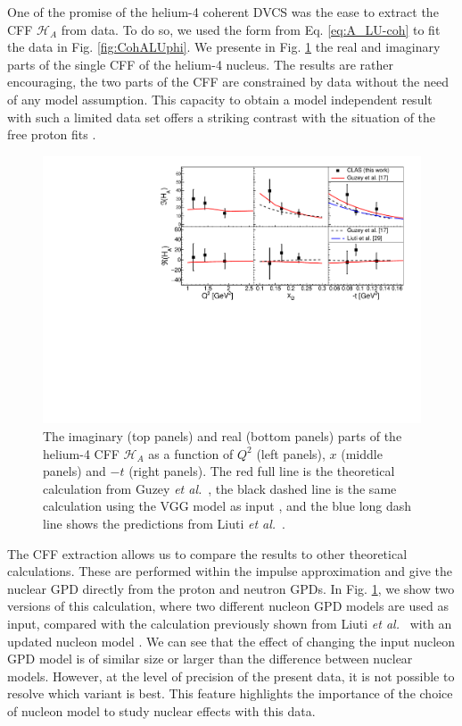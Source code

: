 \documentclass[aps,prc,preprint,superscriptaddress]{revtex4}
\begin{document}
One of the promise of the helium-4 coherent DVCS was the ease to extract the CFF $\mathcal{H}_A$ from
data. To do so, we used the form from Eq. \ref{eq:A_LU-coh} to fit the data in Fig. 
\ref{fig:CohALUphi}. We presente in Fig. \ref{fig:CohCFF} the real and imaginary parts 
of the single CFF of the helium-4 nucleus. The results are rather encouraging, the two parts
of the CFF are constrained by data without the need of any model assumption. This capacity to obtain a
model independent result with such a limited data set offers a striking contrast with the
situation of the free proton fits \cite{Dupre:2016mai,Dupre:2017hfs}.

\begin{figure}[tbp!]
\center
\includegraphics[width=14cm]{fig3/Coherent_CFF.pdf}
	\caption{The imaginary (top panels) and real (bottom panels) parts of the helium-4
	CFF $\mathcal{H}_A$ as a function of $Q^2$ (left panels), $x$ (middle panels) and 
	$-t$ (right panels). The red full line is the theoretical calculation from 
	Guzey {\it et al.}~\cite{Guzey:2003jh,Guzey:2008th}, the black dashed line is the same calculation 
	using the VGG model as input \cite{Vanderhaeghen:1999xj,Guidal:2004nd}, and
	the blue long dash line shows the predictions from Liuti {\it et 
	al.}~\cite{Liuti:2005gi,GonzalezHernandez:2012jv}.} 
\label{fig:CohCFF}
\end{figure}

The CFF extraction allows us to compare the results to other theoretical calculations.
These are performed within the impulse approximation \cite{Guzey:2003jh,Guzey:2008th} 
and give the nuclear GPD directly from the proton and neutron GPDs. In 
Fig. \ref{fig:CohCFF}, we show two versions of this calculation, where two different nucleon GPD
models are used as input, compared with the calculation previously shown from Liuti 
{\it et al.}~\cite{Liuti:2005gi} with an updated nucleon model \cite{GonzalezHernandez:2012jv}.
We can see that the effect of changing the input nucleon GPD model
is of similar size or larger than the difference between nuclear 
models. However, at the level of precision of the present data,
it is not possible to resolve which variant is best. This feature highlights the 
importance of the choice of nucleon model to study nuclear effects with this data.
\end{document}
